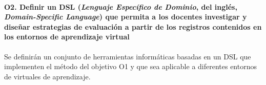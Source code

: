 \paragraph*{O2. Definir un DSL (\emph{Lenguaje Específico de Dominio}, del inglés, \emph{Domain-Specific Language}) que permita a los docentes investigar y diseñar estrategias de evaluación a partir de los registros contenidos en los entornos de aprendizaje virtual}

Se definirán un conjunto de herramientas informáticas basadas en un DSL que implementen el método del objetivo O1 y que sea aplicable a diferentes entornos de virtuales de aprendizaje.









